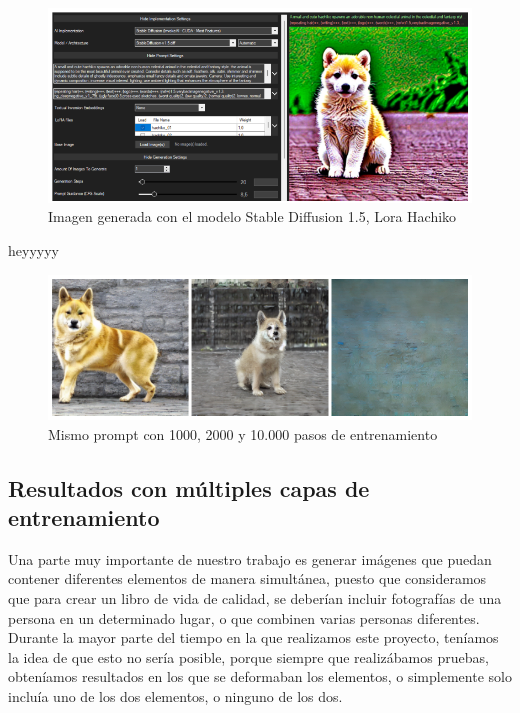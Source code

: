 \begin{figure}[!htb]
	\centering
	\includegraphics[width = 1
	\textwidth]{Imagenes/Vectorial/hachiko_detallada.png}
	\caption{Imagen generada con el modelo Stable Diffusion 1.5, Lora Hachiko}
	\label{fig:detallehachi}
\end{figure}

heyyyyy\\

\begin{figure}[!htb]
	\centering
	\includegraphics[width = 1
	\textwidth]{Imagenes/Vectorial/comparacion_hachiko.png}
	\caption{Mismo prompt con 1000, 2000 y 10.000 pasos de entrenamiento}
	\label{fig:comphachi}
\end{figure}

\subsection{Resultados con múltiples capas de entrenamiento}

Una parte muy importante de nuestro trabajo es generar imágenes que puedan contener diferentes elementos de manera simultánea, puesto que consideramos que para crear un libro de vida de calidad, se deberían incluir fotografías de una persona en un determinado lugar, o que combinen varias personas diferentes. Durante la mayor parte del tiempo en la que realizamos este proyecto, teníamos la idea de que esto no sería posible, porque siempre que realizábamos pruebas, obteníamos resultados en los que se deformaban los elementos, o simplemente solo incluía uno de los dos elementos, o ninguno de los dos. 

